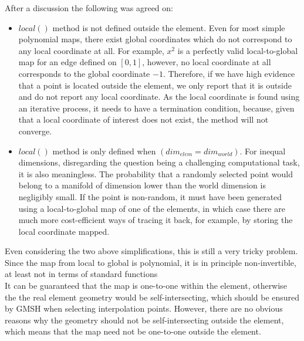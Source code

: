 \noindent
After a discussion the following was agreed on:
\begin{itemize}
	\item $local()$ method is not defined outside the element. Even for most simple polynomial maps, there exist global coordinates which do not correspond to any local coordinate at all. For example, $x^2$ is a perfectly valid local-to-global map for an edge defined on $[0,1]$, however, no local coordinate at all corresponds to the global coordinate $-1$. Therefore, if we have high evidence that a point is located outside the element, we only report that it is outside and do not report any local coordinate. As the local coordinate is found using an iterative process, it needs to have a termination condition, because, given that a local coordinate of interest does not exist, the method will not converge.
	\item $local()$ method is only defined when $(dim_{elem} = dim_{world})$. For inequal dimensions, disregarding the question being a challenging computational task, it is also meaningless. The probability that a randomly selected point would belong to a manifold of dimension lower than the world dimension is negligibly small. If the point is non-random, it must have been generated using a local-to-global map of one of the elements, in which case there are much more cost-efficient ways of tracing it back, for example, by storing the local coordinate mapped.
\end{itemize}

\noindent
Even considering the two above simplifications, this is still a very tricky problem. Since the map from local to global is polynomial, it is in principle non-invertible, at least not in terms of standard functions \\

\noindent
It can be guaranteed that the map is one-to-one within the element, otherwise the the real element geometry would be self-intersecting, which should be ensured by GMSH when selecting interpolation points. However, there are no obvious reasons why the geometry should not be self-intersecting outside the element, which means that the map need not be one-to-one outside the element. \\

